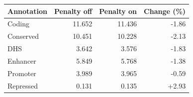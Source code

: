\begin{tabular}{lrrr}
\toprule
Annotation & Penalty off & Penalty on & Change (\%) \\
\midrule
Coding & 11.652 & 11.436 & -1.86 \\
Conserved & 10.451 & 10.228 & -2.13 \\
DHS & 3.642 & 3.576 & -1.83 \\
Enhancer & 5.849 & 5.768 & -1.38 \\
Promoter & 3.989 & 3.965 & -0.59 \\
Repressed & 0.131 & 0.135 & +2.93 \\
\bottomrule
\end{tabular}
